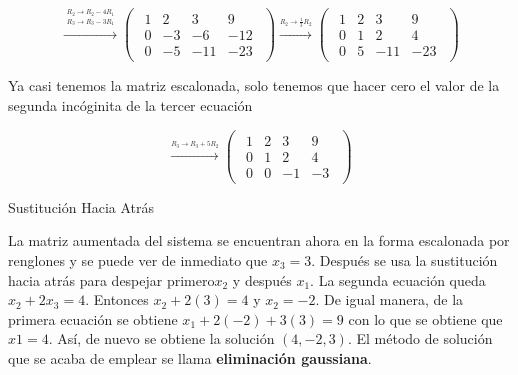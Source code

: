\documentclass{article}
\begin{document}
\begin{equation*}
    \xrightarrow{\overset{\begin{aligned} R_2 \rightarrow R_2 - 4R_1 \\ R_3 \rightarrow R_3 - 3R_1\end{aligned}}{}} 
    \begin{pmatrix}
        \begin{array}{rrr|r}
            1& 2 & 3 & 9\\
            0 &-3 &-6 &-12 \\
            0&-5 &-11 &-23
        \end{array}
    \end{pmatrix}
    \xrightarrow{\stackrel{R_2 \rightarrow \frac{1}{3}R_2}{}}
    \begin{pmatrix}
        \begin{array}{rrr|r}
            1 & 2 & 3 & 9\\
            0 & 1 & 2 & 4\\
            0 & 5 &-11&-23
        \end{array}
    \end{pmatrix}
\end{equation*}

Ya casi tenemos la matriz escalonada, solo tenemos que hacer cero el valor de la segunda incóginita de la tercer ecuación

\begin{equation*}
    \xrightarrow{\overset{R_3 \rightarrow R_3 + 5R_2}{}} 
    \begin{pmatrix}
        \begin{array}{rrr|r}
            1 & 2 & 3 & 9\\
            0 & 1 & 2 & 4 \\
            0 & 0 &-1 &-3
        \end{array}
    \end{pmatrix}
\end{equation*}

\begin{large}
    Sustitución Hacia Atrás
\end{large}

La matriz aumentada del sistema se encuentran ahora en la forma escalonada por renglones y se puede ver de inmediato que $x_3 = 3$. Después se usa la sustitución hacia atrás para despejar primero$x_2$ y después $x_1$. La segunda ecuación queda $x_2 + 2x_3 = 4$. Entonces $x_2 + 2(3) = 4$ y $x_2 =-2$. De igual manera, de la primera ecuación se obtiene $x_1 + 2(-2) + 3(3) = 9$  con lo que se obtiene que $x1 = 4$. Así, de nuevo se obtiene la solución $(4, -2, 3)$. El método de solución que se acaba de emplear se llama \textbf{eliminación gaussiana}.
\end{document}
